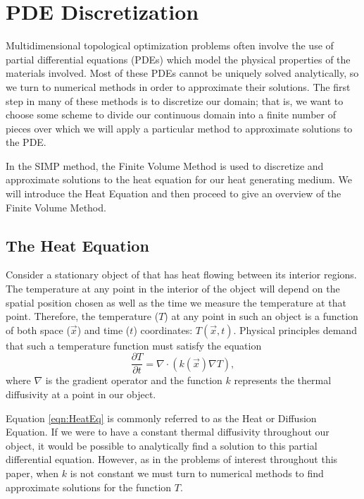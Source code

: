 \section{PDE Discretization}
Multidimensional topological optimization problems often involve the use of partial differential equations (PDEs) which model the physical properties of the materials involved. Most of these PDEs cannot be uniquely solved analytically, so we turn to numerical methods in order to approximate their solutions. The first step in many of these methods is to discretize our domain; that is, we want to choose some scheme to divide our continuous domain into a finite number of pieces over which we will apply a particular method to approximate solutions to the PDE.

In the SIMP method, the Finite Volume Method is used to discretize and approximate solutions to the heat equation for our heat generating medium. We will introduce the Heat Equation and then proceed to give an overview of the Finite Volume Method.
\subsection{The Heat Equation}
Consider a stationary object of that has heat flowing between its interior regions. The temperature at any point in the interior of the object will depend on the spatial position chosen as well as the time we measure the temperature at that point. Therefore, the temperature ($T$) at any point in such an object is a function of both space ($\vec{x}$) and time ($t$) coordinates: $T(\vec{x},t)$.
Physical principles demand that such a temperature function must satisfy the equation
\begin{equation}
	\frac{\partial T}{\partial t}=\nabla\cdot\left(k(\vec{x})\nabla T\right)\label{eqn:HeatEq},
\end{equation}
where $\nabla$ is the gradient operator and the function $k$ represents the thermal diffusivity at a point in our object.

Equation \eqref{eqn:HeatEq} is commonly referred to as the Heat or Diffusion Equation. If we were to have a constant thermal diffusivity throughout our object, it would be possible to analytically find a solution to this partial differential equation. However, as in the problems of interest throughout this paper, when $k$ is not constant we must turn to numerical methods to find approximate solutions for the function $T$.

